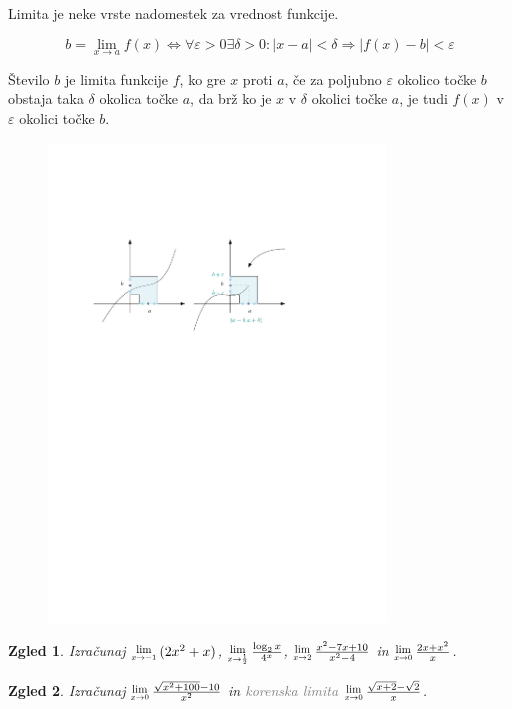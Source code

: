 \documentclass{article}
\newcommand{\Lim}[1]{\raisebox{0.5ex}{\scalebox{0.8}{$\displaystyle \lim_{#1}\;$}}}
\newtheorem*{zgled}{Zgled}
\begin{document}
Limita je neke vrste nadomestek za vrednost funkcije.

\[b=\lim_{x\rightarrow a}f(x) \iff \forall \varepsilon >0 \exists \delta >0: |x-a|<\delta \Rightarrow |f(x)-b|<\varepsilon\]

Število $b$ je limita funkcije $f$, ko gre $x$  proti $a$, če za poljubno $\varepsilon$ okolico točke $b$ obstaja taka $\delta$ okolica točke $a$, da brž ko je $x$ v $\delta$ okolici točke $a$, je tudi $f(x)$ v $\varepsilon$ okolici točke $b$.

\begin{figure}[H]
    \includegraphics[width=0.8\textwidth]{limite_def.pdf}
    \centering
\end{figure}

\begin{zgled}
    Izračunaj $\Lim{x\rightarrow -1} (2x^2+x)$, $\Lim{x\rightarrow \frac{1}{2}} \frac{\log_2 x}{4^x}$, $\Lim{x\rightarrow 2} \frac{x^2-7x+10}{x^2-4}$ in $\Lim{x\rightarrow 0} \frac{2x+x^2}{x}$.
\end{zgled}

\begin{zgled}
    Izračunaj $\Lim{x\rightarrow 0}\frac{\sqrt{x^2 +100}-10}{x^2}$ in \textcolor{gray}{korenska limita} $\Lim{x\rightarrow 0} \frac{\sqrt{x+2}-\sqrt{2}}{x}$.
\end{zgled}
\end{document}
